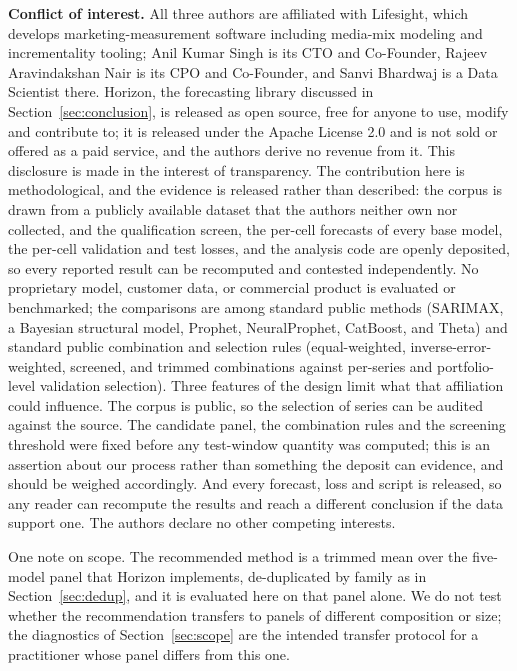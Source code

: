 \documentclass[11pt]{article}
\begin{document}
\textbf{Conflict of interest.} All three authors are affiliated with Lifesight, which develops marketing-measurement software including media-mix modeling and incrementality tooling; Anil Kumar Singh is its CTO and Co-Founder, Rajeev Aravindakshan Nair is its CPO and Co-Founder, and Sanvi Bhardwaj is a Data Scientist there. Horizon, the forecasting library discussed in Section~\ref{sec:conclusion}, is released as open source, free for anyone to use, modify and contribute to; it is released under the Apache License 2.0 and is not sold or offered as a paid service, and the authors derive no revenue from it. This disclosure is made in the interest of transparency. The contribution here is methodological, and the evidence is released rather than described: the corpus is drawn from a publicly available dataset that the authors neither own nor collected, and the qualification screen, the per-cell forecasts of every base model, the per-cell validation and test losses, and the analysis code are openly deposited, so every reported result can be recomputed and contested independently. No proprietary model, customer data, or commercial product is evaluated or benchmarked; the comparisons are among standard public methods (SARIMAX, a Bayesian structural model, Prophet, NeuralProphet, CatBoost, and Theta) and standard public combination and selection rules (equal-weighted, inverse-error-weighted, screened, and trimmed combinations against per-series and portfolio-level validation selection). Three features of the design limit what that affiliation could influence. The corpus is public, so the selection of series can be audited against the source. The candidate panel, the combination rules and the screening threshold were fixed before any test-window quantity was computed; this is an assertion about our process rather than something the deposit can evidence, and should be weighed accordingly. And every forecast, loss and script is released, so any reader can recompute the results and reach a different conclusion if the data support one. The authors declare no other competing interests.

One note on scope. The recommended method is a trimmed mean over the five-model panel that Horizon implements, de-duplicated by family as in Section~\ref{sec:dedup}, and it is evaluated here on that panel alone. We do not test whether the recommendation transfers to panels of different composition or size; the diagnostics of Section~\ref{sec:scope} are the intended transfer protocol for a practitioner whose panel differs from this one.
\end{document}
